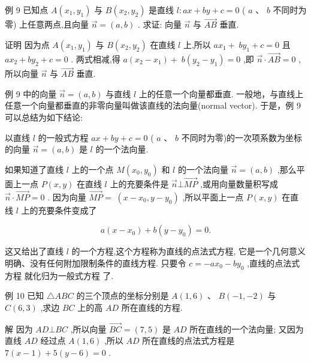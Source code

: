\documentclass[10pt]{article}
\newcommand*\circled[1]{\tikz[baseline=(char.base)]{\node[shape=circle,draw,inner sep=1.5pt] (char) {\small #1};}}
\begin{document}
例 9 已知点 \(A\left( {{x}_{1},{y}_{1}}\right)\) 与 \(B\left( {{x}_{2},{y}_{2}}\right)\) 是直线 \(l : {ax} + {by} + c = 0\) ( \(a\text{ 、 }b\) 不同时为零) 上任意两点,且向量 \(\overrightarrow{n} = \left( {a,b}\right)\) . 求证: 向量 \(\overrightarrow{n}\) 与 \(\overrightarrow{AB}\) 垂直.

证明 因为点 \(A\left( {{x}_{1},{y}_{1}}\right)\) 与 \(B\left( {{x}_{2},{y}_{2}}\right)\) 在直线 \(l\) 上,所以 \(a{x}_{1} + \; b{y}_{1} + c = 0\) 且 \(a{x}_{2} + b{y}_{2} + c = 0\) . 两式相减,得 \(a\left( {{x}_{2} - {x}_{1}}\right)  + \; b\left( {{y}_{2} - {y}_{1}}\right)  = 0\) ,即 \(\overrightarrow{n} \cdot  \overrightarrow{AB} = 0\) ,所以向量 \(\overrightarrow{n}\) 与 \(\overrightarrow{AB}\) 垂直.

例 9 中的向量 \(\overrightarrow{n} = \left( {a,b}\right)\) 与直线 \(l\) 上的任意一个向量都垂直. 一般地，与直线上任意一个向量都垂直的非零向量叫做该直线的法向量(normal vector). 于是，例 9 可以总结为如下结论:

以直线 \(l\) 的一般式方程 \({ax} + {by} + c = 0\) ( \(a\) 、 \(b\) 不同时为零)的一次项系数为坐标的向量 \(\overrightarrow{n} = \left( {a,b}\right)\) 是 \(l\) 的一个法向量.

如果知道了直线 \(l\) 上的一个点 \(M\left( {{x}_{0},{y}_{0}}\right)\) 和 \(l\) 的一个法向量 \(\overrightarrow{n} = \left( {a,b}\right)\) ,那么平面上一点 \(P\left( {x,y}\right)\) 在直线 \(l\) 上的充要条件是 \(\overrightarrow{n} \bot  \overrightarrow{MP}\) ,或用向量数量积写成 \(\overrightarrow{n} \cdot  \overrightarrow{MP} = 0\) . 因为向量 \(\overrightarrow{MP} = \; \left( {x - {x}_{0},y - {y}_{0}}\right)\) ,所以平面上一点 \(P\left( {x,y}\right)\) 在直线 \(l\) 上的充要条件变成了

\[
a\left( {x - {x}_{0}}\right)  + b\left( {y - {y}_{0}}\right)  = 0.
\]
  \circled{5} 

这又给出了直线 \(l\) 的一个方程,这个方程称为直线的点法式方程, 它是一个几何意义明确、没有任何附加限制条件的直线方程. 只要令 \(c =  - a{x}_{0} - b{y}_{0}\) ,直线的点法式方程 \circled{5} 就化归为一般式方程 \circled{4} 了.

例 10 已知 \(\bigtriangleup {ABC}\) 的三个顶点的坐标分别是 \(A\left( {1,6}\right)\) 、 \(B\left( {-1, - 2}\right)\) 与 \(C\left( {6,3}\right)\) ,求边 \({BC}\) 上的高 \({AD}\) 所在直线的方程.

解 因为 \({AD} \bot  {BC}\) ,所以向量 \(\overrightarrow{BC} = \left( {7,5}\right)\) 是 \({AD}\) 所在直线的一个法向量; 又因为直线 \({AD}\) 经过点 \(A\left( {1,6}\right)\) ,所以 \({AD}\) 所在直线的点法式方程是 \(7\left( {x - 1}\right)  + 5\left( {y - 6}\right)  = 0\) .
\end{document}
